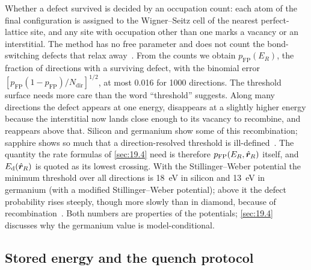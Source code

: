Whether a defect survived is decided by an occupation count: each atom of the final configuration is assigned to the Wigner--Seitz cell of the nearest perfect-lattice site, and any site with occupation other than one marks a vacancy or an interstitial. The method has no free parameter and does not count the bond-switching defects that relax away~\cite[Sect.~II\,A]{sassi2022energy}. From the counts we obtain $p_{\mathrm{FP}}(E_R)$, the fraction of directions with a surviving defect, with the binomial error $[p_{\mathrm{FP}}(1 - p_{\mathrm{FP}})/N_{\mathrm{dir}}]^{1/2}$, at most \num{0.016} for 1000 directions. The threshold surface needs more care than the word ``threshold'' suggests. Along many directions the defect appears at one energy, disappears at a slightly higher energy because the interstitial now lands close enough to its vacancy to recombine, and reappears above that. Silicon and germanium show some of this recombination; sapphire shows so much that a direction-resolved threshold is ill-defined~\cite[Sect.~II\,B]{sassi2022energy}. The quantity the rate formulas of \cref{sec:19.4} need is therefore $p_{\mathrm{FP}}(E_R, \hat{\bm{r}}_R)$ itself, and $E_{\mathrm{d}}(\hat{\bm{r}}_R)$ is quoted as its lowest crossing. With the Stillinger--Weber potential the minimum threshold over all directions is \SI{18}{eV} in silicon and \SI{13}{eV} in germanium (with a modified Stillinger--Weber potential); above it the defect probability rises steeply, though more slowly than in diamond, because of recombination~\cite[Table~II, Fig.~1 and Sect.~II\,B]{sassi2022energy}. Both numbers are properties of the potentials; \cref{sec:19.4} discusses why the germanium value is model-conditional.

\subsection{Stored energy and the quench protocol}

